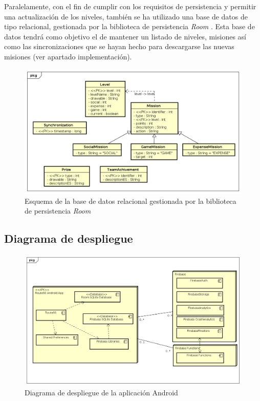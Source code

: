 \documentclass[twoside]{report}
\begin{document}
Paralelamente, con el fin de cumplir con los requisitos de persistencia y permitir una actualización de los niveles, también se ha utilizado una base de datos de tipo relacional, gestionada por la biblioteca de persistencia  \textit{Room} \cite{roompersistence}. Esta base de datos tendrá como objetivo el de mantener un listado de niveles, misiones así como las sincronizaciones que se hayan hecho para descargarse las nuevas misiones (ver apartado implementación).

\begin{figure}[H]
\centering
\includegraphics[scale=0.5]{images/databaseRoom}
\caption{Esquema de la base de datos relacional gestionada por la biblioteca de persistencia \textit{Room} \cite{roompersistence}}
\end{figure}

\subsection{Diagrama de despliegue}

\begin{figure}[H]
\centering
\includegraphics[scale=0.5]{images/deploymentModel}
\caption{Diagrama de despliegue de la aplicación Android}
\end{figure}
\end{document}
